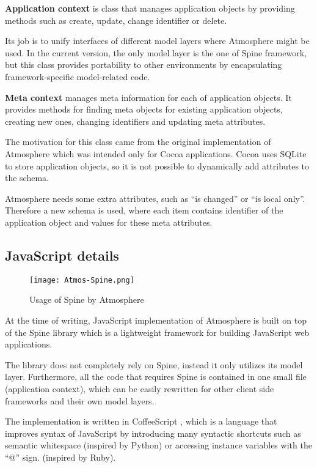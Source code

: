 \textbf{Application context} is class that manages application objects by providing methods such as create, update, change identifier or delete.

Its job is to unify interfaces of different model layers where Atmosphere might be used. In the current version, the only model layer is the one of Spine framework, but this class provides portability to other environments by encapsulating framework-specific model-related code.

\textbf{Meta context} manages meta information for each of application objects. It provides methods for finding meta objects for existing application objects, creating new ones, changing identifiers and updating meta attributes.

The motivation for this class came from the original implementation of Atmosphere which was intended only for Cocoa applications. Cocoa uses SQLite to store application objects, so it is not possible to dynamically add attributes to the schema.

Atmosphere needs some extra attributes, such as ``is changed'' or ``is local only''. Therefore a new schema is used, where each item contains identifier of the application object and values for these meta attributes.

\subsection{JavaScript details}

\begin{figure}[htbp]
  \centering
    \texttt{[image: Atmos-Spine.png]}
  \caption{Usage of Spine by Atmosphere}
  \label{fig:figures_Atmos-Spine}
\end{figure}


At the time of writing, JavaScript implementation of Atmosphere is built on top of the Spine \citep{spinejs} library which is a lightweight framework for building JavaScript web applications.

The library does not completely rely on Spine, instead it only utilizes its model layer. Furthermore, all the code that requires Spine is contained in one small file (application context), which can be easily rewritten for other client side frameworks and their own model layers.

The implementation is written in CoffeeScript \citep{coffeescript}, which is a language that improves syntax of JavaScript by introducing many syntactic shortcuts such as semantic whitespace (inspired by Python) or accessing instance variables with the ``@'' sign. (inspired by Ruby).

